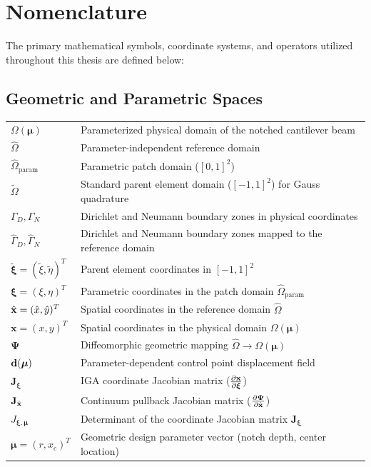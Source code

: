 \chapter*{Nomenclature}

\noindent The primary mathematical symbols, coordinate systems, and operators utilized throughout this thesis are defined below:

\section*{Geometric and Parametric Spaces}
\begin{tabular}{p{3.0cm} p{11.0cm}}
    $\Omega(\boldsymbol{\mu})$ & Parameterized physical domain of the notched cantilever beam \\
    $\hat{\Omega}$              & Parameter-independent reference domain \\
    $\hat{\Omega}_{\text{param}}$ & Parametric patch domain ($[0,1]^2$) \\
    $\tilde{\Omega}$            & Standard parent element domain ($[-1,1]^2$) for Gauss quadrature \\
    $\Gamma_D, \Gamma_N$        & Dirichlet and Neumann boundary zones in physical coordinates \\
    $\hat{\Gamma}_D, \hat{\Gamma}_N$ & Dirichlet and Neumann boundary zones mapped to the reference domain \\
    $\tilde{\boldsymbol{\xi}} = (\tilde{\xi}, \tilde{\eta})^T$ & Parent element coordinates in $[-1,1]^2$ \\
    $\boldsymbol{\xi} = (\xi, \eta)^T$ & Parametric coordinates in the patch domain $\hat{\Omega}_{\text{param}}$ \\
    $\hat{\mathbf{x}} = (\hat{x}, \hat{y})^T$ & Spatial coordinates in the reference domain $\hat{\Omega}$ \\
    $\boldsymbol{x} = (x, y)^T$ & Spatial coordinates in the physical domain $\Omega(\boldsymbol{\mu})$ \\
    $\boldsymbol{\Psi}$          & Diffeomorphic geometric mapping $\hat{\Omega} \to \Omega(\boldsymbol{\mu})$ \\
    $\mathbf{d}(\boldsymbol{\mu})$ & Parameter-dependent control point displacement field \\
    $\mathbf{J}_{\boldsymbol{\xi}}$ & IGA coordinate Jacobian matrix ($\frac{\partial \mathbf{x}}{\partial \boldsymbol{\xi}}$) \\
    $\mathbf{J}_{\hat{\mathbf{x}}}$   & Continuum pullback Jacobian matrix ($\frac{\partial \boldsymbol{\Psi}}{\partial \hat{\mathbf{x}}}$) \\
    $J_{\boldsymbol{\xi}, \boldsymbol{\mu}}$ & Determinant of the coordinate Jacobian matrix $\mathbf{J}_{\boldsymbol{\xi}}$ \\
    $\boldsymbol{\mu} = (r, x_c)^T$ & Geometric design parameter vector (notch depth, center location) \\
\end{tabular}

